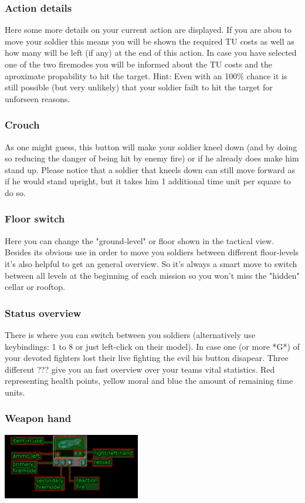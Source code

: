 \subsubsection{Action details}
Here some more details on your current action are displayed. If you are abou to move your soldier this means you will be shown the required TU costs as well as how many will be left (if any) at the end of this action. In case you have selected one of the two firemodes you will be informed about the TU costs and the aproximate propability to hit the target. Hint: Even with an 100\% chance it is still possible (but very unlikely) that your soldier failt to hit the target for unforseen reasons.
\subsubsection{Crouch}
As one might guess, this button will make your soldier kneel down (and by doing so reducing the danger of being hit by enemy fire) or if he already does make him stand up. Please notice that a soldier that kneels down can still move forward as if he would stand upright, but it takes him 1 additional time unit per square to do so.
\subsubsection{Floor switch}
Here you can change the "ground-level" or floor shown in the tactical view. Besides its obvious use in order to move you soldiers between different floor-levels it's also helpful to get an general overview. So it's always a smart move to switch between all levels at the beginning of each mission so you won't miss the "hidden" cellar or rooftop.
\subsubsection{Status overview}
There is where you can switch between you soldiers (alternatively use keybindings: 1 to 8 or just left-click on their model). In case one (or more *G*) of your devoted fighters lost their live fighting the evil his button disapear. Three different ??? give you an fast overview over your teams vital statistics. Red representing health points, yellow moral and blue the amount of remaining time units.
\subsubsection{Weapon hand}
\includegraphics[width=6cm]{images/altHUD_detail_final.jpg}

